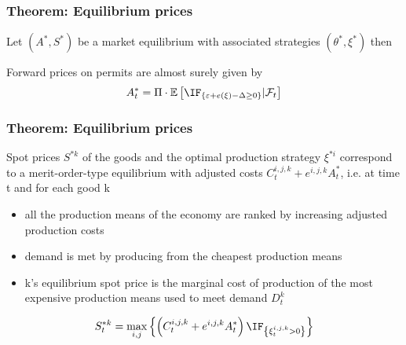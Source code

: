 \begin{frame}\frametitle{Theorem: Equilibrium prices}
Let $(A^*,S^*)$ be a market equilibrium with associated strategies $(\theta^*,\xi^*)$ then

Forward prices on permits are almost surely given by \[
A^*_t = \Pi \cdot \mathbb{E} \left[ \IF_{\left\{ \varepsilon + e(\xi) - \Delta \ge 0 \right\}} | \mathcal{F}_t \right]
\]

\end{frame}


\begin{frame}\frametitle{Theorem: Equilibrium prices}
 Spot prices $S^{*k}$ of the goods and the optimal production strategy $\xi^{*i}$ correspond to a merit-order-type equilibrium with adjusted costs $C_t^{i,j,k} + e^{i,j,k} A_t^*$, i.e. at time t and for each good k
\begin{itemize}
\item all the production means of the economy are ranked by increasing adjusted production costs
\item demand is met by producing from the cheapest production means
\item k's equilibrium spot price is the marginal cost of production of the most expensive production means used to meet demand $D_t^k$
\end{itemize}
\[
S_t^{*k} = \max_{i,j} \left\{ \left(C_t^{i,j,k} + e^{i,j,k} A_t^* \right) \IF_{\left\{\xi_t^{i,j,k}>0\right\}}\right\}
\]
\end{frame}

